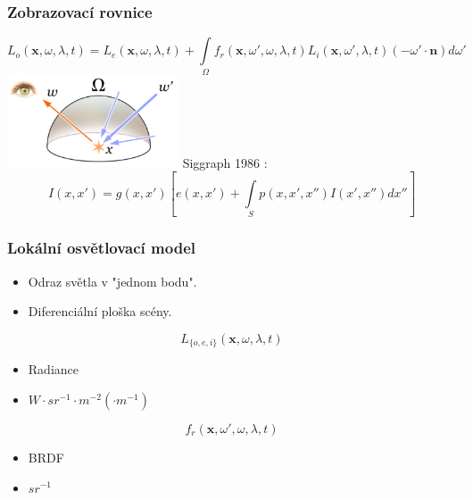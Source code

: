 \begin{frame}
    \frametitle{Zobrazovací rovnice}
    \begin{equation*}
        L_o(\mathbf x, \omega, \lambda, t) = L_e(\mathbf x, \omega, \lambda, t) + \int\limits_\Omega f_r(\mathbf x, \omega', \omega, \lambda, t) L_i(\mathbf x, \omega', \lambda, t) (-\omega' \cdot \mathbf n) d \omega'
    \end{equation*}
    \includegraphics[width=2in]{pics/physicallyBasedRendering/rendering}
    \vfill
    Siggraph 1986 :
    \begin{equation*}
        \displaystyle I(x, x') = g(x, x')\left[ e(x, x') + \int\limits_S p(x, x', x'')I(x', x'')dx''\right]
    \end{equation*}
\end{frame}

\begin{frame}
    \frametitle{Lokální osvětlovací model}

    \begin{itemize}
        \item Odraz světla v "jednom bodu".
        \item Diferenciální ploška scény.
    \end{itemize}
    \pause\vfill
    \begin{equation*}
        L_{\{o,e,i\}}(\mathbf x, \omega, \lambda, t)
    \end{equation*}
    \begin{itemize}
         \item Radiance
         \item $W \cdot sr^{-1} \cdot m^{-2} (\cdot m^{-1})$
    \end{itemize}
    \pause\vfill
    \begin{equation*}
        f_r(\mathbf x, \omega', \omega, \lambda, t)
    \end{equation*}
    \begin{itemize}
        \item BRDF
        \item $sr^{-1}$
    \end{itemize}
\end{frame}

